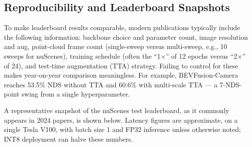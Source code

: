 \subsection{Reproducibility and Leaderboard Snapshots}\label{reproducibility-and-leaderboard-snapshots}

To make leaderboard results comparable, modern publications typically include the following information: backbone choice and parameter count, image resolution and aug, point-cloud frame count (single-sweep versus multi-sweep, e.g., 10 sweeps for nuScenes), training schedule (often the ``1×'' of 12 epochs versus ``2×'' of 24), and test-time augmentation (TTA) strategy. Failing to control for these makes year-on-year comparison meaningless. For example, BEVFusion-Camera reaches 53.5\% NDS without TTA and 60.6\% with multi-scale TTA --- a 7-NDS-point swing from a single hyperparameter.

A representative snapshot of the nuScenes test leaderboard, as it commonly appears in 2024 papers, is shown below. Latency figures are approximate, on a single Tesla V100, with batch size 1 and FP32 inference unless otherwise noted; INT8 deployment can halve these numbers.


